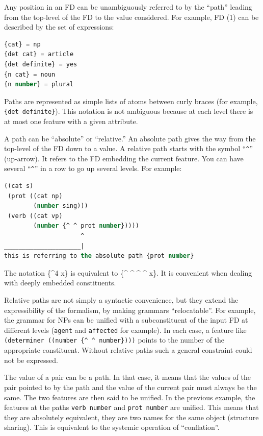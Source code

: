 \documentclass[10pt,a4paper]{report}
\begin{document}
Any position in an FD can be unambiguously referred to by the ``path''
leading from the top-level of the FD to the value considered. For
example, FD (1) can be described by the set of expressions:

\begin{lstlisting}[language=Lisp]
{cat} = np
{det cat} = article
{det definite} = yes
{n cat} = noun
{n number} = plural
\end{lstlisting}

Paths are represented as simple lists of atoms between curly braces
(for example, {\tt \{det definite\}}).  This notation is not ambiguous because
at each level there is at most one feature with a given attribute.

A path can be ``absolute'' or ``relative.'' An absolute path gives the way
from the top-level of the FD down to a value. A relative path starts with
the symbol ``{\tt \^{}}'' (up-arrow). It refers to the FD embedding the current
feature. You can have several ``{\tt \^{}}'' in a row to go up several levels.
 
For example: 

\begin{lstlisting}[language=Lisp]
((cat s)
 (prot ((cat np)
		(number sing)))
 (verb ((cat vp)
		(number {^ ^ prot number}))))
                     ^
_____________________|    
this is referring to the absolute path {prot number}
\end{lstlisting}

The notation \{\^{}4 x\} is equivalent to \{\^{} \^{} \^{} \^{} x\}.  It is convenient when
dealing with deeply embedded constituents. 

Relative paths are not simply a syntactic convenience, but they extend the
expressibility of the formalism, by making grammars ``relocatable''.  For
example, the grammar for NPs can be unified with a subconstituent of the
input FD at different levels ({\tt {agent}} and {\tt {affected}} for example).
In each case, a feature like {\tt (determiner ((number \{\^{} \^{} number\})))}
points to the number of the appropriate constituent.  Without relative
paths such a general constraint could not be expressed.

The value of a pair can be a path. In that case, it means that the values
of the pair pointed to by the path and the value of the current pair must
always be the same.  The two features are then said to be unified.  In the
previous example, the features at the paths {\tt {verb number}} and {\tt {prot
number}} are unified. This means that they are absolutely equivalent, they
are two names for the same object (structure sharing).  This is equivalent
to the systemic operation of ``conflation''.
 
\end{document}
